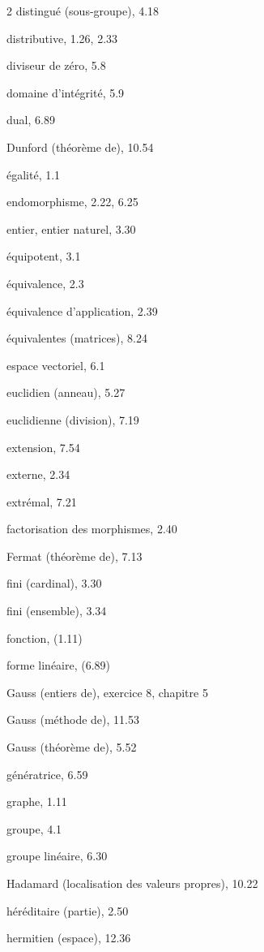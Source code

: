 \begin{multicols}{2}
distingué (sous-groupe), 4.18

distributive, 1.26, 2.33

diviseur de zéro, 5.8

domaine d'intégrité, 5.9

dual, 6.89

Dunford (théorème de), 10.54

\medskip
égalité, 1.1

endomorphisme, 2.22, 6.25

entier, entier naturel, 3.30

équipotent, 3.1

équivalence, 2.3

équivalence d'application, 2.39

équivalentes (matrices), 8.24


espace vectoriel, 6.1

euclidien (anneau), 5.27

euclidienne (division), 7.19


extension, 7.54

externe, 2.34

extrémal, 7.21

\medskip
factorisation des morphismes, 2.40

Fermat (théorème de), 7.13

fini (cardinal), 3.30

fini (ensemble), 3.34

fonction, (1.11)

forme linéaire, (6.89)

\medskip
Gauss (entiers de), exercice 8, chapitre 5

Gauss (méthode de), 11.53

Gauss (théorème de), 5.52

génératrice, 6.59

graphe, 1.11

groupe, 4.1

groupe linéaire, 6.30

\medskip
Hadamard (localisation des valeurs propres), 10.22

héréditaire (partie), 2.50

hermitien (espace), 12.36


\end{multicols}
